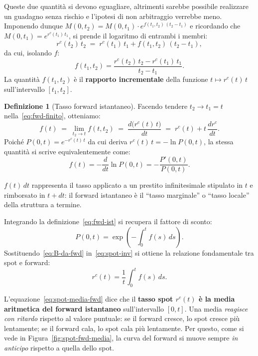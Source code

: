 \documentclass[11pt,a4paper]{article}
\theoremstyle{plain}
\theoremstyle{definition}
\newtheorem{definizione}[teorema]{Definizione}
\theoremstyle{remark}
\begin{document}
Queste due quantit\`a si devono eguagliare, altrimenti sarebbe possibile realizzare un guadagno
senza rischio e l'ipotesi di non arbitraggio verrebbe meno. Imponendo dunque
$M(0,t_2) = M(0,t_1)\cdot e^{f(t_1,t_2)\,(t_2-t_1)}$ e ricordando che $M(0,t_1)=e^{r^c(t_1)\,t_1}$, si prende il logaritmo di entrambi i membri:
\[
  r^c(t_2)\,t_2 \;=\; r^c(t_1)\,t_1 + f(t_1,t_2)\,(t_2-t_1),
\]
da cui, isolando $f$:
\begin{equation}
  f(t_1, t_2) = \frac{r^c(t_2)\,t_2 - r^c(t_1)\,t_1}{t_2 - t_1}.
  \label{eq:fwd-finito}
\end{equation}
La quantità $f(t_1,t_2)$ \`e il \textbf{rapporto incrementale} della funzione
$t\mapsto r^c(t)\,t$ sull'intervallo $[t_1,t_2]$.

\begin{definizione}[Tasso forward istantaneo]
\label{def:forward}
Facendo tendere $t_2 \to t_1 = t$ nella~\eqref{eq:fwd-finito}, otteniamo:
\begin{equation}
  f(t) \;=\; \lim_{t_2 \to t} f(t, t_2)
       \;=\; \frac{d\bigl(r^c(t)\,t\bigr)}{dt}
       \;=\; r^c(t) + t\,\frac{dr^c}{dt}.
  \label{eq:fwd-ist}
\end{equation}
Poich\'e $P(0,t)=e^{-r^c(t)\,t}$ da cui deriva $r^c(t)\,t=-\ln P(0,t)$, la stessa quantit\`a si
scrive equivalentemente come:
\[
  f(t) = -\frac{d}{dt}\ln P(0,t) = -\frac{P'(0,t)}{P(0,t)}.
\]
\end{definizione}

$f(t)\,dt$ rappresenta il tasso applicato a un prestito infinitesimale stipulato in $t$
e rimborsato in $t+dt$: il forward istantaneo \`e il ``tasso marginale'' o ``tasso locale''
della struttura a termine.


Integrando la definizione~\eqref{eq:fwd-ist} si recupera il fattore di sconto:
\begin{equation}
  P(0,t) = \exp\!\left(-\int_0^t f(s)\,ds\right).
  \label{eq:B-da-fwd}
\end{equation}
Sostituendo~\eqref{eq:B-da-fwd} in~\eqref{eq:spot-inv} si ottiene la relazione
fondamentale tra spot e forward:
\begin{equation}
  r^c(t) = \frac{1}{t}\int_0^t f(s)\,ds.
  \label{eq:spot-media-fwd}
\end{equation}

L'equazione~\eqref{eq:spot-media-fwd} dice che il \textbf{tasso spot $r^c(t)$ \`e la media
aritmetica del forward istantaneo} sull'intervallo $[0,t]$. Una media \emph{reagisce con
ritardo} rispetto al valore puntuale: se il forward cresce, lo spot cresce pi\`u lentamente;
se il forward cala, lo spot cala pi\`u lentamente. Per questo, come si vede in
Figura~\ref{fig:spot-fwd-media}, la curva del forward si muove sempre \emph{in anticipo}
rispetto a quella dello spot.
\end{document}
